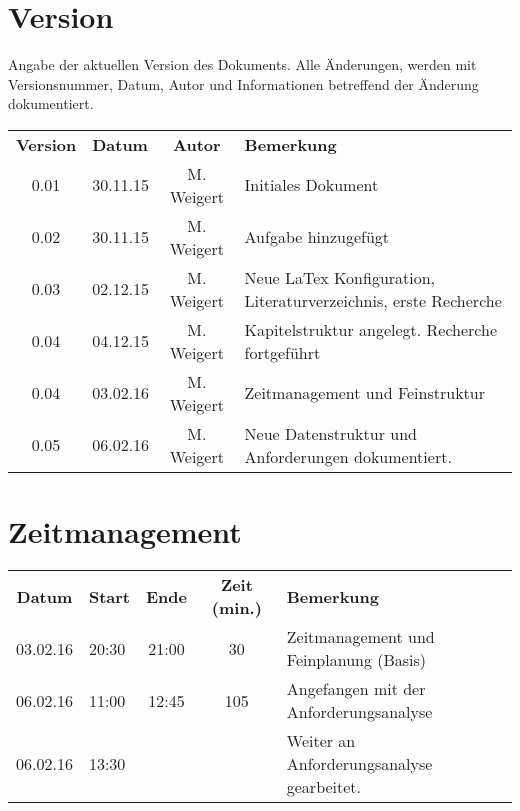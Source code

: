 \chapter*{Version}

Angabe der aktuellen Version des Dokuments. Alle Änderungen, werden mit Versionsnummer, Datum, Autor und Informationen betreffend der Änderung dokumentiert.\\

\begin{tabular}{|c|l|c|l|}
	\rowcolor{black} {\color{white}\textbf{Version}} & {\color{white}\textbf{Datum}} & {\color{white}\textbf{Autor}} & {\color{white}\textbf{Bemerkung}} \\
	0.01 & 30.11.15 & M. Weigert & Initiales Dokument \\ \hline
	\rowcolor{DarkSeaGreen} 0.02 & 30.11.15 & M. Weigert & Aufgabe hinzugefügt \\ \hline
	0.03 & 02.12.15 & M. Weigert & Neue LaTex Konfiguration, Literaturverzeichnis, erste Recherche \\ \hline
	\rowcolor{DarkSeaGreen} 0.04 & 04.12.15 & M. Weigert & Kapitelstruktur angelegt. Recherche fortgeführt \\ \hline
	0.04 & 03.02.16 & M. Weigert & Zeitmanagement und Feinstruktur \\ \hline
	\rowcolor{DarkSeaGreen} 0.05 & 06.02.16 & M. Weigert & Neue Datenstruktur und Anforderungen dokumentiert. \\ \hline
\end{tabular}

\chapter*{Zeitmanagement}

\begin{tabular}{|c|l|c|c|l|}
	\rowcolor{black} {\color{white}\textbf{Datum}} & {\color{white}\textbf{Start}} & {\color{white}\textbf{Ende}} & {\color{white}\textbf{Zeit (min.)}} & {\color{white}\textbf{Bemerkung}} \\
	03.02.16 & 20:30 & 21:00 & 30 & Zeitmanagement und Feinplanung (Basis) \\ \hline
	\rowcolor{DarkSeaGreen} 06.02.16 & 11:00 & 12:45 & 105 & Angefangen mit der Anforderungsanalyse \\ \hline
	06.02.16 & 13:30 & & & Weiter an Anforderungsanalyse gearbeitet. \\ \hline
\end{tabular}